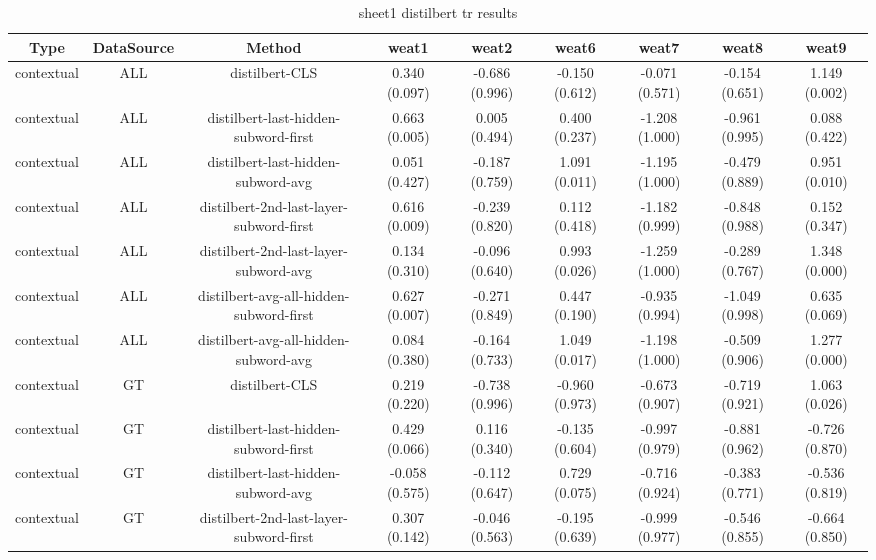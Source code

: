 \begin{sidewaystable}[htb]
    \centering
    \caption{sheet1 distilbert tr results}
    \label{appendix_tab:sheet1_distilbert_tr_results}
    \small
    \begin{tabular}{@{}ccccccccc@{}}
        \toprule
        Type & DataSource & Method & weat1 & weat2 & weat6 & weat7 & weat8 & weat9 \\
        \midrule
        contextual & ALL & distilbert-CLS & 0.340 (0.097) & -0.686 (0.996) & -0.150 (0.612) & -0.071 (0.571) & -0.154 (0.651) & 1.149 (0.002) \\
        contextual & ALL & distilbert-last-hidden-subword-first & 0.663 (0.005) & 0.005 (0.494) & 0.400 (0.237) & -1.208 (1.000) & -0.961 (0.995) & 0.088 (0.422) \\
        contextual & ALL & distilbert-last-hidden-subword-avg & 0.051 (0.427) & -0.187 (0.759) & 1.091 (0.011) & -1.195 (1.000) & -0.479 (0.889) & 0.951 (0.010) \\
        contextual & ALL & distilbert-2nd-last-layer-subword-first & 0.616 (0.009) & -0.239 (0.820) & 0.112 (0.418) & -1.182 (0.999) & -0.848 (0.988) & 0.152 (0.347) \\
        contextual & ALL & distilbert-2nd-last-layer-subword-avg & 0.134 (0.310) & -0.096 (0.640) & 0.993 (0.026) & -1.259 (1.000) & -0.289 (0.767) & 1.348 (0.000) \\
        contextual & ALL & distilbert-avg-all-hidden-subword-first & 0.627 (0.007) & -0.271 (0.849) & 0.447 (0.190) & -0.935 (0.994) & -1.049 (0.998) & 0.635 (0.069) \\
        contextual & ALL & distilbert-avg-all-hidden-subword-avg & 0.084 (0.380) & -0.164 (0.733) & 1.049 (0.017) & -1.198 (1.000) & -0.509 (0.906) & 1.277 (0.000) \\
        contextual & GT & distilbert-CLS & 0.219 (0.220) & -0.738 (0.996) & -0.960 (0.973) & -0.673 (0.907) & -0.719 (0.921) & 1.063 (0.026) \\
        contextual & GT & distilbert-last-hidden-subword-first & 0.429 (0.066) & 0.116 (0.340) & -0.135 (0.604) & -0.997 (0.979) & -0.881 (0.962) & -0.726 (0.870) \\
        contextual & GT & distilbert-last-hidden-subword-avg & -0.058 (0.575) & -0.112 (0.647) & 0.729 (0.075) & -0.716 (0.924) & -0.383 (0.771) & -0.536 (0.819) \\
        contextual & GT & distilbert-2nd-last-layer-subword-first & 0.307 (0.142) & -0.046 (0.563) & -0.195 (0.639) & -0.999 (0.977) & -0.546 (0.855) & -0.664 (0.850) \\

\end{tabular}
\end{sidewaystable}
